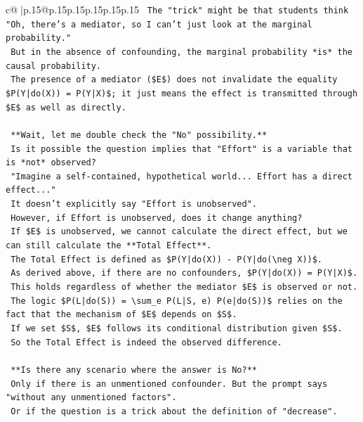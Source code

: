 \documentclass{article}
\begin{document}
{\begin{supertabular}{c@{$\;$}|p{.15\linewidth}@{}p{.15\linewidth}p{.15\linewidth}p{.15\linewidth}p{.15\linewidth}p{.15\linewidth}}
{{{\texttt{    The "trick" might be that students think "Oh, there's a mediator, so I can't just look at the marginal probability."} \\
\texttt{    But in the absence of confounding, the marginal probability *is* the causal probability.} \\
\texttt{    The presence of a mediator (\$E\$) does not invalidate the equality \$P(Y|do(X)) = P(Y|X)\$; it just means the effect is transmitted through \$E\$ as well as directly.} \\
\\ 
\texttt{    **Wait, let me double check the "No" possibility.**} \\
\texttt{    Is it possible the question implies that "Effort" is a variable that is *not* observed?} \\
\texttt{    "Imagine a self{-}contained, hypothetical world... Effort has a direct effect..."} \\
\texttt{    It doesn't explicitly say "Effort is unobserved".} \\
\texttt{    However, if Effort is unobserved, does it change anything?} \\
\texttt{    If \$E\$ is unobserved, we cannot calculate the direct effect, but we can still calculate the **Total Effect**.} \\
\texttt{    The Total Effect is defined as \$P(Y|do(X)) {-} P(Y|do(\textbackslash{}neg X))\$.} \\
\texttt{    As derived above, if there are no confounders, \$P(Y|do(X)) = P(Y|X)\$.} \\
\texttt{    This holds regardless of whether the mediator \$E\$ is observed or not.} \\
\texttt{    The logic \$P(L|do(S)) = \textbackslash{}sum\_e P(L|S, e) P(e|do(S))\$ relies on the fact that the mechanism of \$E\$ depends on \$S\$.} \\
\texttt{    If we set \$S\$, \$E\$ follows its conditional distribution given \$S\$.} \\
\texttt{    So the Total Effect is indeed the observed difference.} \\
\\ 
\texttt{    **Is there any scenario where the answer is No?**} \\
\texttt{    Only if there is an unmentioned confounder. But the prompt says "without any unmentioned factors".} \\
\texttt{    Or if the question is a trick about the definition of "decrease".} \\
}}}
\end{supertabular}}
\end{document}
